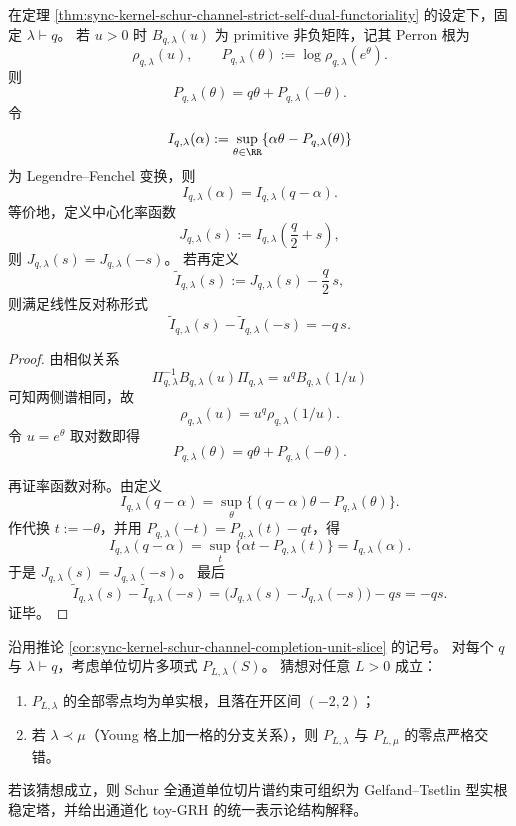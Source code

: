\begin{theorem}\label{thm:sync-kernel-schur-channel-pressure-gc}
在定理 \ref{thm:sync-kernel-schur-channel-strict-self-dual-functoriality} 的设定下，固定 \(\lambda\vdash q\)。
若 \(u>0\) 时 \(B_{q,\lambda}(u)\) 为 primitive 非负矩阵，记其 Perron 根为
\[
\rho_{q,\lambda}(u),\qquad
P_{q,\lambda}(\theta):=\log\rho_{q,\lambda}(e^\theta).
\]
则
\[
P_{q,\lambda}(\theta)=q\theta+P_{q,\lambda}(-\theta).
\]
令
\[
I_{q,\lambda}(\alpha):=\sup_{\theta\in\RR}\{\alpha\theta-P_{q,\lambda}(\theta)\}
\]
为 Legendre--Fenchel 变换，则
\[
I_{q,\lambda}(\alpha)=I_{q,\lambda}(q-\alpha).
\]
等价地，定义中心化率函数
\[
J_{q,\lambda}(s):=I_{q,\lambda}\!\left(\frac q2+s\right),
\]
则 \(J_{q,\lambda}(s)=J_{q,\lambda}(-s)\)。
若再定义
\[
\widetilde I_{q,\lambda}(s):=J_{q,\lambda}(s)-\frac q2\,s,
\]
则满足线性反对称形式
\[
\widetilde I_{q,\lambda}(s)-\widetilde I_{q,\lambda}(-s)=-q\,s.
\]
\end{theorem}
\begin{proof}
由相似关系
\[
\Pi_{q,\lambda}^{-1}B_{q,\lambda}(u)\Pi_{q,\lambda}=u^q B_{q,\lambda}(1/u)
\]
可知两侧谱相同，故
\[
\rho_{q,\lambda}(u)=u^q\rho_{q,\lambda}(1/u).
\]
令 \(u=e^\theta\) 取对数即得
\[
P_{q,\lambda}(\theta)=q\theta+P_{q,\lambda}(-\theta).
\]

再证率函数对称。由定义
\[
I_{q,\lambda}(q-\alpha)
=
\sup_{\theta}\{(q-\alpha)\theta-P_{q,\lambda}(\theta)\}.
\]
作代换 \(t:=-\theta\)，并用 \(P_{q,\lambda}(-t)=P_{q,\lambda}(t)-qt\)，得
\[
I_{q,\lambda}(q-\alpha)
=
\sup_t\{\alpha t-P_{q,\lambda}(t)\}
=
I_{q,\lambda}(\alpha).
\]
于是 \(J_{q,\lambda}(s)=J_{q,\lambda}(-s)\)。
最后
\[
\widetilde I_{q,\lambda}(s)-\widetilde I_{q,\lambda}(-s)
=
\bigl(J_{q,\lambda}(s)-J_{q,\lambda}(-s)\bigr)-q s
=-q s.
\]
证毕。
\end{proof}

\begin{conjecture}\label{conj:sync-kernel-schur-unit-slice-interlacing-tower}
沿用推论 \ref{cor:sync-kernel-schur-channel-completion-unit-slice} 的记号。
对每个 \(q\) 与 \(\lambda\vdash q\)，考虑单位切片多项式 \(P_{L,\lambda}(S)\)。
猜想对任意 \(L>0\) 成立：
\begin{enumerate}
  \item \(P_{L,\lambda}\) 的全部零点均为单实根，且落在开区间 \((-2,2)\)；
  \item 若 \(\lambda\prec\mu\)（Young 格上加一格的分支关系），则 \(P_{L,\lambda}\) 与 \(P_{L,\mu}\) 的零点严格交错。
\end{enumerate}
若该猜想成立，则 Schur 全通道单位切片谱约束可组织为 Gelfand--Tsetlin 型实根稳定塔，并给出通道化 toy-GRH 的统一表示论结构解释。
\end{conjecture}

\endinput
